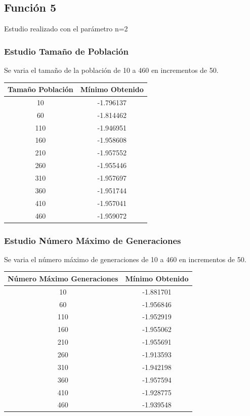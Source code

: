 \documentclass[12pt]{article}
\begin{document}
\subsection{Función 5}
	Estudio realizado con el parámetro n=2
\subsubsection*{Estudio Tamaño de Población}
	Se varia el tamaño de la población de 10 a 460 en incrementos de 50.
\begin{table}[H]
\begin{center}
\begin{tabular}{|cc|} \hline
Tamaño Población & Mínimo Obtenido \\  \hline
10  & -1.796137 \\ 
60  & -1.814462 \\ 
110 & -1.946951 \\
160 & -1.958608 \\
210 & -1.957552 \\
260 & -1.955446 \\
310 & -1.957697 \\
360 & -1.951744 \\ 
410 & -1.957041 \\
460 & -1.959072 \\  \hline
\end{tabular}
\end{center}
\end{table}
 

\subsubsection*{Estudio Número Máximo de Generaciones}
	Se varia el número máximo de generaciones de 10 a 460 en incrementos de 50.
\begin{table}[H]
\begin{center}
\begin{tabular}{|cc|} \hline
Número Máximo Generaciones & Mínimo Obtenido \\  \hline
10  & -1.881701 \\ 
60  & -1.956846 \\ 
110 & -1.952919 \\
160 & -1.955062 \\
210 & -1.955691 \\
260 & -1.913593 \\
310 & -1.942198 \\
360 & -1.957594 \\ 
410 & -1.928775 \\
460 & -1.939548 \\  \hline
\end{tabular}
\end{center}
\end{table}
\end{document}
